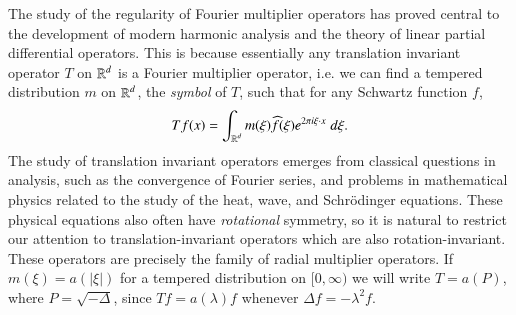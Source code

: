 The study of the regularity of Fourier multiplier operators has proved central to the development of modern harmonic analysis and the theory of linear partial differential operators. This is because essentially any translation invariant operator $T$ on $\operatorname{\mathbb{R}}^d$ is a Fourier multiplier operator, i.e. we can find a tempered distribution $m$ on $\operatorname{\mathbb{R}}^d$, the \emph{symbol} of $T$, such that for any Schwartz function $f$,
%
\[ Tf(x) = \int_{\operatorname{\mathbb{R}}^d} m(\xi) \widehat{f}(\xi) e^{2 \pi i \xi \cdot x}\; d\xi. \]
%
%
%
%
%
The study of translation invariant operators emerges from classical questions in analysis, such as the convergence of Fourier series, and problems in mathematical physics related to the study of the heat, wave, and Schr\"{o}dinger equations. These physical equations also often have \emph{rotational} symmetry, so it is natural to restrict our attention to translation-invariant operators which are also rotation-invariant. These operators are precisely the family of radial multiplier operators. If $m(\xi) = a(|\xi|)$ for a tempered distribution on $[0,\infty)$ we will write $T = a(P)$, where $P = \sqrt{-\Delta}$, since $Tf = a(\lambda) f$ whenever $\Delta f = - \lambda^2 f$.
%
%
%
%
%
%

